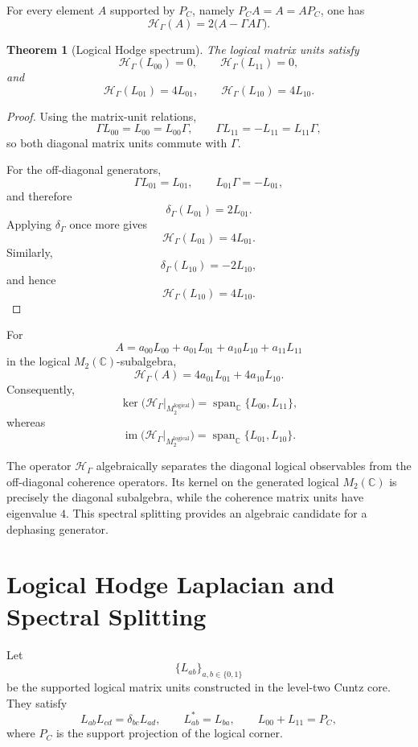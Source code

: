 \documentclass[11pt,a4paper]{article}
\newtheorem{theorem}{Theorem}[section]
\begin{document}
For every element $A$ supported by $P_C$, namely $P_C A = A = A P_C$, one has
\[
\mathcal H_{\Gamma}(A) = 2\bigl(A-\Gamma A\Gamma\bigr).
\]

\begin{theorem}[Logical Hodge spectrum]
The logical matrix units satisfy
\[
\mathcal H_{\Gamma}(L_{00})=0,
\qquad
\mathcal H_{\Gamma}(L_{11})=0,
\]
and
\[
\mathcal H_{\Gamma}(L_{01})=4L_{01},
\qquad
\mathcal H_{\Gamma}(L_{10})=4L_{10}.
\]
\end{theorem}

\begin{proof}
Using the matrix-unit relations,
\[
\Gamma L_{00}=L_{00}=L_{00}\Gamma,
\qquad
\Gamma L_{11}=-L_{11}=L_{11}\Gamma,
\]
so both diagonal matrix units commute with $\Gamma$.

For the off-diagonal generators,
\[
\Gamma L_{01}=L_{01},
\qquad
L_{01}\Gamma=-L_{01},
\]
and therefore
\[
\delta_{\Gamma}(L_{01})=2L_{01}.
\]
Applying $\delta_{\Gamma}$ once more gives
\[
\mathcal H_{\Gamma}(L_{01})=4L_{01}.
\]
Similarly,
\[
\delta_{\Gamma}(L_{10})=-2L_{10},
\]
and hence
\[
\mathcal H_{\Gamma}(L_{10})=4L_{10}.
\]
\end{proof}

\begin{corollary}
For
\[
A = a_{00}L_{00} + a_{01}L_{01} + a_{10}L_{10} + a_{11}L_{11}
\]
in the logical $M_2(\mathbb{C})$-subalgebra,
\[
\mathcal H_{\Gamma}(A) = 4a_{01}L_{01} + 4a_{10}L_{10}.
\]
Consequently,
\[
\ker\bigl(\mathcal H_{\Gamma}\vert_{M_2^{\mathrm{logical}}}\bigr) = \operatorname{span}_{\mathbb{C}}\{L_{00},L_{11}\},
\]
whereas
\[
\operatorname{im}\bigl(\mathcal H_{\Gamma}\vert_{M_2^{\mathrm{logical}}}\bigr) = \operatorname{span}_{\mathbb{C}}\{L_{01},L_{10}\}.
\]
\end{corollary}

The operator $\mathcal H_\Gamma$ algebraically separates the diagonal logical observables from the off-diagonal coherence operators. Its kernel on the generated logical $M_2(\mathbb{C})$ is precisely the diagonal subalgebra, while the coherence matrix units have eigenvalue $4$. This spectral splitting provides an algebraic candidate for a dephasing generator.

\section{Logical Hodge Laplacian and Spectral Splitting}

Let
\[
\{L_{ab}\}_{a,b\in\{0,1\}}
\]
be the supported logical matrix units constructed in the level-two
Cuntz core. They satisfy
\[
L_{ab}L_{cd}=\delta_{bc}L_{ad},
\qquad
L_{ab}^{*}=L_{ba},
\qquad
L_{00}+L_{11}=P_C,
\]
where \(P_C\) is the support projection of the logical corner.
\end{document}
